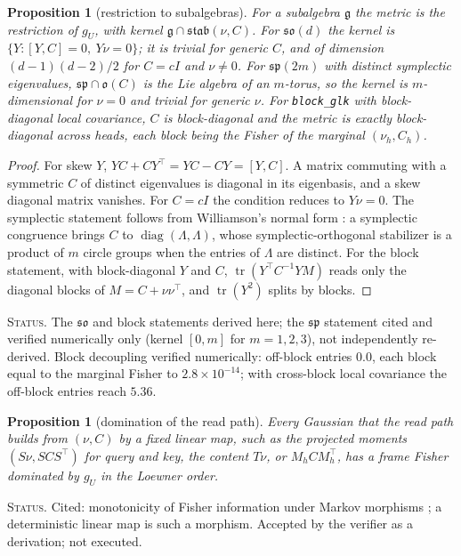 \documentclass[11pt]{article}
\newtheorem{proposition}[theorem]{Proposition}
\theoremstyle{definition}
\theoremstyle{remark}
\newcommand{\g}{\mathfrak{g}}
\newcommand{\tr}{\operatorname{tr}}
\newcommand{\stab}{\mathfrak{stab}}
\newcommand{\status}[1]{\par\smallskip\noindent\textsc{Status.} #1\par\smallskip}
\begin{document}
\begin{proposition}[restriction to subalgebras]\label{prop:subalg}
For a subalgebra $\g$ the metric is the restriction of $g_U$, with kernel $\g\cap\stab(\nu,C)$. For $\mathfrak{so}(d)$ the kernel is $\{Y:[Y,C]=0,\ Y\nu=0\}$; it is trivial for generic $C$, and of dimension $(d-1)(d-2)/2$ for $C=cI$ and $\nu\neq0$. For $\mathfrak{sp}(2m)$ with distinct symplectic eigenvalues, $\mathfrak{sp}\cap\mathfrak{o}(C)$ is the Lie algebra of an $m$-torus, so the kernel is $m$-dimensional for $\nu=0$ and trivial for generic $\nu$. For \texttt{block\_glk} with block-diagonal local covariance, $C$ is block-diagonal and the metric is exactly block-diagonal across heads, each block being the Fisher of the marginal $(\nu_h,C_h)$.
\end{proposition}
\begin{proof}
For skew $Y$, $YC+CY^\top=YC-CY=[Y,C]$. A matrix commuting with a symmetric $C$ of distinct eigenvalues is diagonal in its eigenbasis, and a skew diagonal matrix vanishes. For $C=cI$ the condition reduces to $Y\nu=0$. The symplectic statement follows from Williamson's normal form \cite{Williamson1936}: a symplectic congruence brings $C$ to $\operatorname{diag}(\Lambda,\Lambda)$, whose symplectic-orthogonal stabilizer is a product of $m$ circle groups when the entries of $\Lambda$ are distinct. For the block statement, with block-diagonal $Y$ and $C$, $\tr(Y^\top C^{-1}YM)$ reads only the diagonal blocks of $M=C+\nu\nu^\top$, and $\tr(Y^2)$ splits by blocks.
\end{proof}
\status{The $\mathfrak{so}$ and block statements derived here; the $\mathfrak{sp}$ statement cited and verified numerically only (kernel $[0,m]$ for $m=1,2,3$), not independently re-derived. Block decoupling verified numerically: off-block entries $0.0$, each block equal to the marginal Fisher to $2.8\times10^{-14}$; with cross-block local covariance the off-block entries reach $5.36$.}

\begin{proposition}[domination of the read path]\label{prop:dominate}
Every Gaussian that the read path builds from $(\nu,C)$ by a fixed linear map, such as the projected moments $(S\nu,SCS^\top)$ for query and key, the content $T\nu$, or $M_hCM_h^\top$, has a frame Fisher dominated by $g_U$ in the Loewner order.
\end{proposition}
\status{Cited: monotonicity of Fisher information under Markov morphisms \cite{Cencov1982,AmariNagaoka2000}; a deterministic linear map is such a morphism. Accepted by the verifier as a derivation; not executed.}
\end{document}
